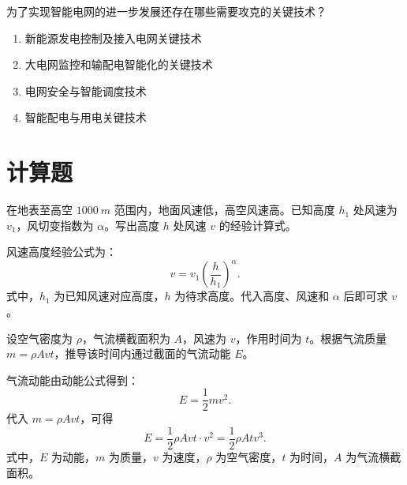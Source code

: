 \begin{problem}\label{exer:think_03_wind_14}
为了实现智能电网的进一步发展还存在哪些需要攻克的关键技术？
\end{problem}

\begin{solution}
\begin{enumerate}
\item 新能源发电控制及接入电网关键技术
\item 大电网监控和输配电智能化的关键技术
\item 电网安全与智能调度技术
\item 智能配电与用电关键技术
\end{enumerate}
\end{solution}

\section{计算题}

\begin{problem}[风速随高度变化]\label{exer:calc_03_wind_p024_01}
在地表至高空 \(\qty{1000}{m}\) 范围内，地面风速低，高空风速高。已知高度 \(h_1\) 处风速为 \(v_1\)，风切变指数为 \(\alpha\)。写出高度 \(h\) 处风速 \(v\) 的经验计算式。
\end{problem}

\begin{solution}
风速高度经验公式为：
\begin{equation}
v = v_1 \left(\frac{h}{h_1}\right)^\alpha.
\end{equation}
式中，\(h_1\) 为已知风速对应高度，\(h\) 为待求高度。代入高度、风速和 \(\alpha\) 后即可求 \(v\)。
\end{solution}

\begin{problem}[气流动能]\label{exer:calc_03_wind_p027_01}
设空气密度为 \(\rho\)，气流横截面积为 \(A\)，风速为 \(v\)，作用时间为 \(t\)。根据气流质量 \(m = \rho A v t\)，推导该时间内通过截面的气流动能 \(E\)。
\end{problem}

\begin{solution}
气流动能由动能公式得到：
\begin{equation}
E = \frac{1}{2}mv^2.
\end{equation}
代入 \(m = \rho A v t\)，可得
\begin{equation}
E = \frac{1}{2}\rho A v t \cdot v^2
  = \frac{1}{2}\rho A t v^3.
\end{equation}
式中，\(E\) 为动能，\(m\) 为质量，\(v\) 为速度，\(\rho\) 为空气密度，\(t\) 为时间，\(A\) 为气流横截面积。
\end{solution}

